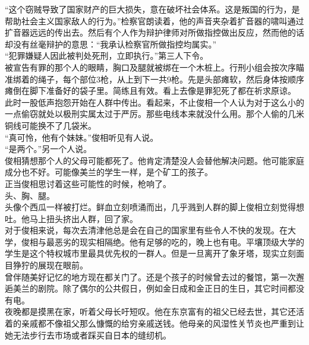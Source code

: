 “这个窃贼导致了国家财产的巨大损失，意在破坏社会体系。这是叛国的行为，是帮助社会主义国家敌人的行为。”检察官朗读着，他的声音夹杂着扩音器的啸叫通过扩音器远远的传出去。然后有个人作为辩护律师对所做指控做出反应，然而他的话却没有丝毫辩护的意思：“我承认检察官所做指控均属实。”\\

“犯罪嫌疑人因此被判处死刑，立即执行。”第三人下令。\\

被宣告有罪的那个人的眼睛，胸口及腿就被绑在一个木桩上。行刑小组会按次序瞄准绑着的绳子，每个部位3枪，从上到下一共9枪。先是头部瘫软，然后身体按顺序瘫倒在脚下准备好的袋子里。简练且有效。看上去像是罪犯死了都在祈求原谅。\\

此时一股低声抱怨开始在人群中传出。看起来，不止俊相一个人认为对于这么小的一点偷窃就处以极刑实属太过于严厉。那些电线本来就没什么用。那个人偷的几米铜线可能换不了几袋米。\\

“真可怜，他有个妹妹。”俊相听见有人说。\\

“是两个。”另一个人说。\\

俊相猜想那个人的父母可能都死了。他肯定清楚没人会替他解决问题。他可能家庭成分也不好。可能像美兰的学生一样，是个矿工的孩子。\\

正当俊相思讨着这些可能性的时候，枪响了。\\

头、胸、腿。\\

头像个西瓜一样被打烂。鲜血立刻喷涌而出，几乎溅到人群的脚上俊相立刻觉得想吐。他马上扭头挤出人群，回了家。\\

对于俊相来说，每次去清津他总是会在自己的国家里有些令人不快的发现。在大学，俊相与最恶劣的现实相隔绝。他有足够的吃的，晚上也有电。平壤顶级大学的学生是这个特权城市里最具优先权的一群人。但是一旦离开了象牙塔，现实立刻面目狰狞的展现在眼前。\\

曾伴随美好记忆的地方现在都关门了。还是个孩子的时候曾去过的餐馆，第一次邂逅美兰的剧院。除了偶尔的公共假日，例如金日成和金正日的生日，其它时间都没有电。\\

夜晚都是摸黑在家，听着父母长吁短叹。他在东京富有的祖父已经去世，其它还活着的亲戚都不像祖父那么慷慨的给穷亲戚送钱。他母亲的风湿性关节炎也严重到让她无法步行去市场或者踩买自日本的缝纫机。\\

